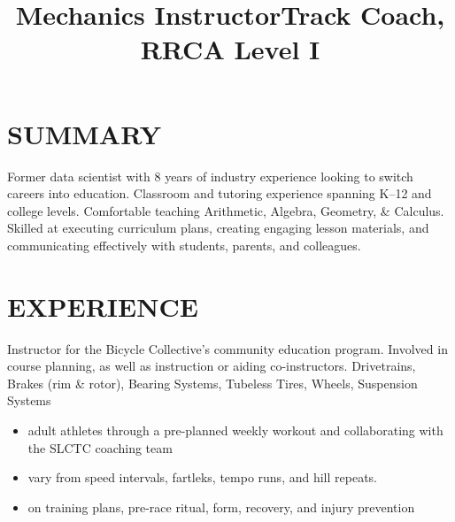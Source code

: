 \documentclass[resmargin, centered, 10pt]{../res}
\begin{document}
\address{\href{mailto:kirkwood.donavin@gmail.com}{Kirkwood.Donavin@Gmail.com}}
\address{+1 (801) 554-6834}
\address{}
\address{}

\begin{resume}
\small
    
\fullline

\section{SUMMARY}

Former data scientist with 8 years of industry experience looking to switch careers into education. Classroom and tutoring experience spanning K–12 and college levels. Comfortable teaching Arithmetic, Algebra, Geometry, \& Calculus. Skilled at executing curriculum plans, creating engaging lesson materials, and communicating effectively with students, parents, and colleagues.

\fullline

\section{EXPERIENCE}

\title{Mechanics Instructor}
\begin{position}
	Instructor for the Bicycle Collective's community education program. Involved in course planning, as well as instruction or aiding co-instructors.  Drivetrains, Brakes (rim \& rotor), Bearing Systems, Tubeless Tires, Wheels, Suspension Systems
\end{position}

\title{Track Coach, RRCA Level I}
\begin{position}
	\begin{itemize}
		\item {} adult athletes through a pre-planned weekly workout and collaborating with the SLCTC coaching team
		\item {} vary from speed intervals, fartleks, tempo runs, and hill repeats.
		\item {} on training plans, pre-race ritual, form, recovery, and injury prevention
	\end{itemize}
\end{position}


\end{resume}
\end{document}
